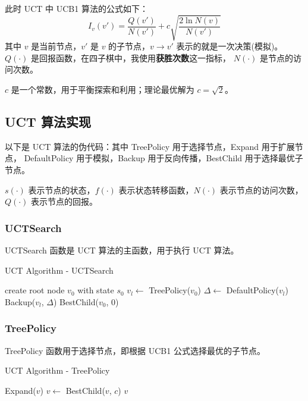 \documentclass[UTF8]{ctexart}
\begin{document}
此时 UCT 中 UCB1 算法的公式如下：
\begin{equation}
    I_v(v') = \frac{Q(v')}{N(v')} + c\sqrt{\frac{2\ln N(v)}{N(v')}} \tag{2}
\end{equation}
其中 $v$ 是当前节点，$v'$ 是 $v$ 的子节点，$v \to v'$ 表示的就是一次决策(模拟)。
$Q(\cdot)$ 是回报函数，在四子棋中，我使用\textbf{获胜次数}这一指标，
$N(\cdot)$ 是节点的访问次数。

$c$ 是一个常数，用于平衡探索和利用；理论最优解为 $c = \sqrt{2}$。

\subsection{UCT 算法实现}

以下是 UCT 算法的伪代码：其中 TreePolicy 用于选择节点，Expand 用于扩展节点，
DefaultPolicy 用于模拟，Backup 用于反向传播，BestChild 用于选择最优子节点。

$s(\cdot)$ 表示节点的状态，$f(\cdot)$ 表示状态转移函数，$N(\cdot)$ 表示节点的访问次数，
$Q(\cdot)$ 表示节点的回报。

\subsubsection{UCTSearch}

UCTSearch 函数是 UCT 算法的主函数，用于执行 UCT 算法。

\begin{algorithm}[H]
    \caption{UCT Algorithm - UCTSearch}
    \begin{algorithmic}
            \State create root node $v_0$ with state $s_0$
                \State $v_l \gets$ TreePolicy($v_0$)
                \State $\Delta \gets$ DefaultPolicy($v_l$)
                \State Backup($v_l$, $\Delta$)
            \EndWhile
            \State \Return BestChild($v_0$, $0$)
        \EndFunction
    \end{algorithmic}
\end{algorithm}

\subsubsection{TreePolicy}

TreePolicy 函数用于选择节点，即根据 UCB1 公式选择最优的子节点。

\begin{algorithm}[H]
    \caption{UCT Algorithm - TreePolicy}
    \begin{algorithmic}
                    \State \Return Expand($v$)
                \Else
                    \State $v \gets$ BestChild($v$, $c$)
                \EndIf
            \EndWhile
            \State \Return $v$
        \EndFunction
    \end{algorithmic}
\end{algorithm}
\end{document}
